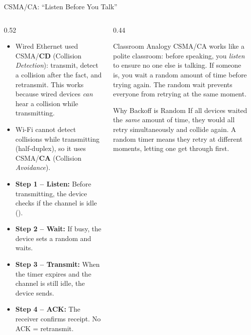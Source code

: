 \documentclass[aspectratio=169]{beamer}
\begin{document}
\begin{frame}{CSMA/CA: ``Listen Before You Talk''}
    \begin{columns}[T]
        \begin{column}{0.52\textwidth}
            \footnotesize
            \begin{itemize}
                \item Wired Ethernet used CSMA/\textbf{CD} (Collision \emph{Detection}): transmit, detect a collision after the fact, and retransmit. This works because wired devices \emph{can} hear a collision while transmitting.
                \item Wi-Fi cannot detect collisions while transmitting (half-duplex), so it uses CSMA/\textbf{CA} (Collision \emph{Avoidance}).
                \item \textbf{Step 1 -- Listen:} Before transmitting, the device checks if the channel is idle ().
                \item \textbf{Step 2 -- Wait:} If busy, the device sets a random  and waits.
                \item \textbf{Step 3 -- Transmit:} When the timer expires and the channel is still idle, the device sends.
                \item \textbf{Step 4 -- ACK:} The receiver confirms receipt. No ACK = retransmit.
            \end{itemize}
        \end{column}
        \begin{column}{0.44\textwidth}
            \begin{exampleblock}{Classroom Analogy}
                \footnotesize
                CSMA/CA works like a polite classroom: before speaking, you \emph{listen} to ensure no one else is talking. If someone is, you wait a random amount of time before trying again. The random wait prevents everyone from retrying at the same moment.
            \end{exampleblock}
            \vspace{0.3em}
            \begin{alertblock}{Why Backoff is Random}
                \footnotesize
                If all devices waited the \emph{same} amount of time, they would all retry simultaneously and collide again. A random timer means they retry at different moments, letting one get through first.
            \end{alertblock}
        \end{column}
    \end{columns}
\end{frame}
\end{document}
